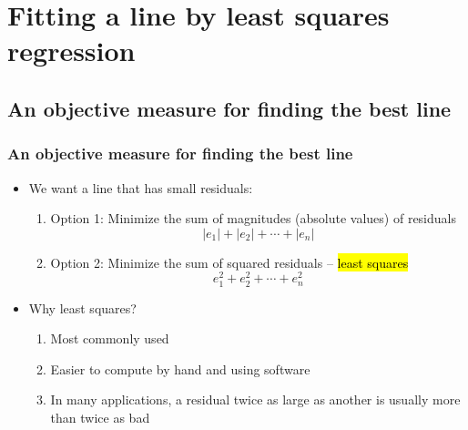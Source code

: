 
\section{Fitting a line by least squares regression}


\subsection{An objective measure for finding the best line}


\begin{frame}
\frametitle{An objective measure for finding the best line}

\begin{itemize}

\item We want a line that has small residuals:
\pause
\begin{enumerate}
\item Option 1: Minimize the sum of magnitudes (absolute values) of residuals
\[ |e_1| + |e_2| + \cdots + |e_n| \]
\pause
\item Option 2: Minimize the sum of squared residuals -- \hl{least squares}
\[ e_1^2 + e_2^2 + \cdots + e_n^2 \]
\end{enumerate}

\pause

\item Why least squares?
\pause
\begin{enumerate}
\item Most commonly used
\pause
\item Easier to compute by hand and using software
\pause
\item In many applications, a residual twice as large as another is usually more than twice as bad
\end{enumerate}

\end{itemize}

\end{frame}


